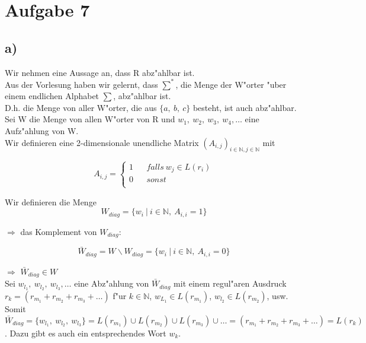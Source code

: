 \documentclass[a4paper,11pt]{scrartcl}
\begin{document}
	
\section*{Aufgabe 7}

\subsection*{a)}

	Wir nehmen eine Aussage an, dass R abz"ahlbar ist.\\ 

	Aus der Vorlesung haben wir gelernt, dass $\sum ^{*}$, die Menge der W"orter "uber einem endlichen Alphabet $\sum$, abz"ahlbar ist.\\
	
	D.h. die Menge von aller W"orter, die aus $\{ a,\ b,\ c\}$ besteht, ist auch abz"ahlbar.\\
	
	
	Sei W die Menge von allen W"orter von R und $w_1,\ w_2,\ w_3,\ w_4,\dots$ eine Aufz"ahlung von W.\\
	
	Wir definieren eine 2-dimensionale unendliche Matrix $(A_{i,j})_{i\in \mathbb{N},j\in \mathbb{N}}$ mit
	
	
	$$ A_{i,j}=\left\{
	\begin{aligned}
		1 &  & falls\ w_j \in L(r_i)\\
		0 &  & sonst\\
	\end{aligned}
	\right.
	$$
	
	Wir definieren die Menge
	$$
	W_{diag} = \{ w_i\ |\ i\in \mathbb{N},\ A_{i,i} = 1 \} 
	$$
	
	$\Longrightarrow$ das Komplement von $W_{diag}$:
	
	$$
	\bar{W}_{diag} = W\backslash W_{diag} = \{ w_i\ |\ i\in \mathbb{N},\ A_{i,i} = 0 \} 
	$$
	
	$\Longrightarrow$ $\bar{W}_{diag} \in W$\\
	
	Sei $w_{l_1},\ w_{l_2},\ w_{l_3},\dots$ eine Abz"ahlung von $\bar{W}_{diag}$ mit einem regul"aren Ausdruck $r_k = (r_{m_1} + r_{m_2} + r_{m_3} + \dots )$ f"ur $k\in \mathbb{N}$, $w_{L_1}\in L(r_{m_1})$, $w_{l_2} \in L(r_{m_2})$, usw.\\ 
	
	Somit $\bar{W}_{diag} =\{ w_{l_1},\ w_{l_2},\ w_{l_3} \} = L(r_{m_1}) \cup L(r_{m_2}) \cup L(r_{m_3}) \cup \dots = (r_{m_1} + r_{m_2} + r_{m_3} + \dots ) = L(r_k)$. Dazu gibt es auch ein entsprechendes Wort $w_k$.\\
	
\end{document}
